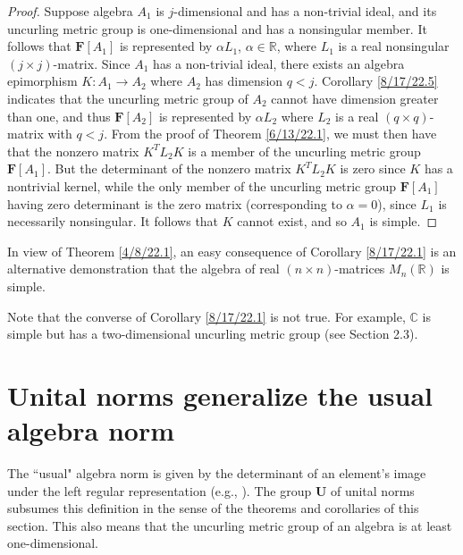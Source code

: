 \documentclass{amsart}
\numberwithin{equation}{section}
\theoremstyle{definition}
\numberwithin{theorem}{section}
\begin{document}
\begin{proof} Suppose algebra $A_1$ is $j$-dimensional and has a non-trivial ideal, and its uncurling metric group is one-dimensional and has a nonsingular member.  It follows that $\mathbf{F}[A_1]$ is represented by  $\alpha L_1$, $\alpha\in \mathbb{R}$, where $L_1$ is a real nonsingular $(j\times j)$-matrix.  Since $A_1$ has a non-trivial ideal, there exists an algebra epimorphism $K:A_1\rightarrow A_2$ where $A_2$ has dimension $q<j$.  Corollary \ref{8/17/22.5} indicates that the uncurling metric group of $A_2$ cannot have dimension greater than one, and thus $\mathbf{F}[A_2]$ is represented by $\alpha L_2$ where $L_2$ is a real $(q\times q)$-matrix with $q<j$. From the proof of Theorem \ref{6/13/22.1}, we must then have that the nonzero matrix $ K^T L_2 K$ is a member of the uncurling metric group $\mathbf{F}[A_1]$.  But the determinant of the nonzero matrix $ K^T L_2 K$ is zero since $K$ has a nontrivial kernel, while the only member of the uncurling metric group $\mathbf{F}[A_1]$ having zero determinant is the zero matrix (corresponding to $\alpha=0$), since $L_1$ is necessarily nonsingular.   It follows that $K$ cannot exist, and so $A_1$ is simple. \end{proof}


In view of Theorem \ref{4/8/22.1}, an easy consequence of Corollary \ref{8/17/22.1} is an alternative demonstration that the algebra of real $(n\times n)$-matrices $ M_n(\mathbb{R})$ is simple.  

Note that the converse of Corollary \ref{8/17/22.1} is not true.  For example, $\mathbb{C}$ is simple but has a two-dimensional uncurling metric group (see Section 2.3).


\section{Unital norms generalize the usual algebra norm} 
The ``usual" algebra norm is given by the determinant of an element's image under the left regular representation (e.g., \cite{bourbaki:1989}).  The group $\mathbf{U}$ of unital norms subsumes this definition in the sense of the theorems and corollaries of this section.  This also means that the uncurling metric group of an algebra is at least one-dimensional.
\end{document}

